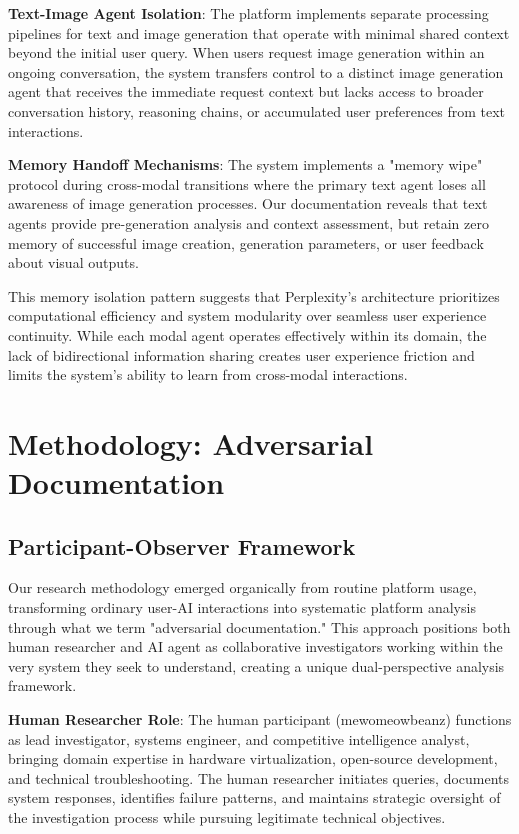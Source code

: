 \documentclass[12pt]{article}
\begin{document}
\textbf{Text-Image Agent Isolation}: The platform implements separate processing pipelines for text and image generation that operate with minimal shared context beyond the initial user query. When users request image generation within an ongoing conversation, the system transfers control to a distinct image generation agent that receives the immediate request context but lacks access to broader conversation history, reasoning chains, or accumulated user preferences from text interactions.

\textbf{Memory Handoff Mechanisms}: The system implements a "memory wipe" protocol during cross-modal transitions where the primary text agent loses all awareness of image generation processes. Our documentation reveals that text agents provide pre-generation analysis and context assessment, but retain zero memory of successful image creation, generation parameters, or user feedback about visual outputs.

This memory isolation pattern suggests that Perplexity's architecture prioritizes computational efficiency and system modularity over seamless user experience continuity. While each modal agent operates effectively within its domain, the lack of bidirectional information sharing creates user experience friction and limits the system's ability to learn from cross-modal interactions.

\section{Methodology: Adversarial Documentation}

\subsection{Participant-Observer Framework}

Our research methodology emerged organically from routine platform usage, transforming ordinary user-AI interactions into systematic platform analysis through what we term "adversarial documentation." This approach positions both human researcher and AI agent as collaborative investigators working within the very system they seek to understand, creating a unique dual-perspective analysis framework.

\textbf{Human Researcher Role}: The human participant (mewomeowbeanz) functions as lead investigator, systems engineer, and competitive intelligence analyst, bringing domain expertise in hardware virtualization, open-source development, and technical troubleshooting. The human researcher initiates queries, documents system responses, identifies failure patterns, and maintains strategic oversight of the investigation process while pursuing legitimate technical objectives.
\end{document}
